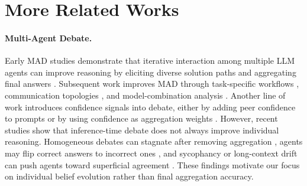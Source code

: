 \documentclass{article}
\theoremstyle{plain}
\theoremstyle{definition}
\theoremstyle{remark}
\begin{document}



\newpage
\appendix
\onecolumn



\section{More Related Works}
\label{app:more_related}
\paragraph{Multi-Agent Debate.}
Early MAD studies demonstrate that iterative interaction among multiple LLM agents can improve reasoning by eliciting diverse solution paths and aggregating final answers \cite{du2023improving, liang2024encouraging, chan2024chateval}. Subsequent work improves MAD through task-specific workflows \cite{liu2024groupdebate, zhang2025debate4math, maiga2025error, yao2025peacemaker}, communication topologies \cite{li2024improving, sun2025cortexdebate, eo2025necessary}, and model-combination analysis \cite{zhang2025if, smit2023should}. Another line of work introduces confidence signals into debate, either by adding peer confidence to prompts \cite{yang2024confidence, chen2024reconcile} or by using confidence as aggregation weights \cite{lin2025enhancing, eo2025necessary, yoffe2024debunc}. However, recent studies show that inference-time debate does not always improve individual reasoning. Homogeneous debates can stagnate after removing aggregation \cite{choi2025debate}, agents may flip correct answers to incorrect ones \cite{wynn2025talk}, and sycophancy or long-context drift can push agents toward superficial agreement \cite{pan2025multiagent, yang2025revisiting}. These findings motivate our focus on individual belief evolution rather than final aggregation accuracy.
\end{document}
